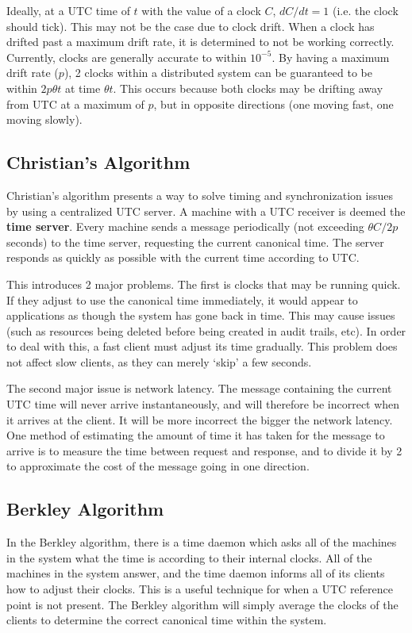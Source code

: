 \documentclass{article}
\begin{document}
Ideally, at a UTC time of $t$ with the value of a clock $C$, $dC/dt=1$ (i.e. the clock should tick). This may not be the case due to clock drift. When a clock has drifted past a maximum drift rate, it is determined to not be working correctly. Currently, clocks are generally accurate to within $10^{-5}$. By having a maximum drift rate ($p$), 2 clocks within a distributed system can be guaranteed to be within $2p \theta t$ at time $\theta t$. This occurs because both clocks may be drifting away from UTC at a maximum of $p$, but in opposite directions (one moving fast, one moving slowly).

\subsection{Christian's Algorithm}
Christian's algorithm presents a way to solve timing and synchronization issues by using a centralized UTC server. A machine with a UTC receiver is deemed the \textbf{time server}. Every machine sends a message periodically (not exceeding $\theta C / 2p$ seconds) to the time server, requesting the current canonical time. The server responds as quickly as possible with the current time according to UTC. 

This introduces 2 major problems. The first is clocks that may be running quick. If they adjust to use the canonical time immediately, it would appear to applications as though the system has gone back in time. This may cause issues (such as resources being deleted before being created in audit trails, etc). In order to deal with this, a fast client must adjust its time gradually. This problem does not affect slow clients, as they can merely `skip' a few seconds. 

The second major issue is network latency. The message containing the current UTC time will never arrive instantaneously, and will therefore be incorrect when it arrives at the client. It will be more incorrect the bigger the network latency. One method of estimating the amount of time it has taken for the message to arrive is to measure the time between request and response, and to divide it by 2 to approximate the cost of the message going in one direction. 

\subsection{Berkley Algorithm}
In the Berkley algorithm, there is a time daemon which asks all of the machines in the system what the time is according to their internal clocks. All of the machines in the system answer, and the time daemon informs all of its clients how to adjust their clocks. This is a useful technique for when a UTC reference point is not present. The Berkley algorithm will simply average the clocks of the clients to determine the correct canonical time within the system.
\end{document}

